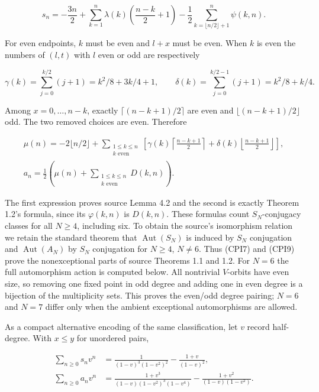 \[
 s_n=-\frac{3n}{2}+\sum_{k=1}^n\lambda(k)\left(\frac{n-k}{2}+1\right)
 -\frac12\sum_{k=\lfloor n/2\rfloor+1}^n\psi(k,n).
 \tag{CPI7}
\]

For even endpoints, \(k\) must be even and \(l+x\) must be even. When
\(k\) is even the numbers of \((l,t)\) with \(l\) even or odd are
respectively

\[
 \gamma(k)=\sum_{j=0}^{k/2}(j+1)=k^2/8+3k/4+1,\qquad
 \delta(k)=\sum_{j=0}^{k/2-1}(j+1)=k^2/8+k/4.
 \tag{CPI8}
\]

Among \(x=0,\ldots,n-k\), exactly \(\lceil(n-k+1)/2\rceil\) are even and
\(\lfloor(n-k+1)/2\rfloor\) odd. The two removed choices are even.
Therefore

\[
 \begin{gathered}
 \mu(n)=-2\lfloor n/2\rfloor+
 \sum_{\substack{1\le k\le n\\k\text{ even}}}
 \left[\gamma(k)\left\lceil\frac{n-k+1}{2}\right\rceil+
 \delta(k)\left\lfloor\frac{n-k+1}{2}\right\rfloor\right],\\
 a_n=\frac12\left(\mu(n)+\sum_{\substack{1\le k\le n\\k\text{ even}}}D(k,n)\right).
 \end{gathered}
 \tag{CPI9}
\]

The first expression proves source Lemma 4.2 and the second is exactly
Theorem 1.2's formula, since its \(\varphi(k,n)\) is \(D(k,n)\). These
formulas count \(S_N\)-conjugacy classes for all \(N\ge4\), including
six. To obtain the source's isomorphism relation we retain the standard
theorem that \(\operatorname{Aut}(S_N)\) is induced by \(S_N\)
conjugation and \(\operatorname{Aut}(A_N)\) by \(S_N\) conjugation for
\(N\ge4\), \(N\ne6\). Thus (CPI7) and (CPI9) prove the nonexceptional
parts of source Theorems 1.1 and 1.2. For \(N=6\) the full automorphism
action is computed below. All nontrivial \(V\)-orbits have even size, so
removing one fixed point in odd degree and adding one in even degree is
a bijection of the multiplicity sets. This proves the even/odd degree
pairing; \(N=6\) and \(N=7\) differ only when the ambient exceptional
automorphisms are allowed.

As a compact alternative encoding of the same classification, let \(v\)
record half-degree. With \(x\le y\) for unordered pairs,

\[
 \begin{aligned}
 \sum_{n\ge0}s_nv^n&=\frac1{(1-v)^3(1-v^2)^2}-\frac{1+v}{(1-v)^2},\\
 \sum_{n\ge0}a_nv^n&=\frac{1+v^3}{(1-v)(1-v^2)^3(1-v^4)}-
 \frac{1+v^2}{(1-v)(1-v^2)}.
 \end{aligned}
 \tag{CPI10}
\]

